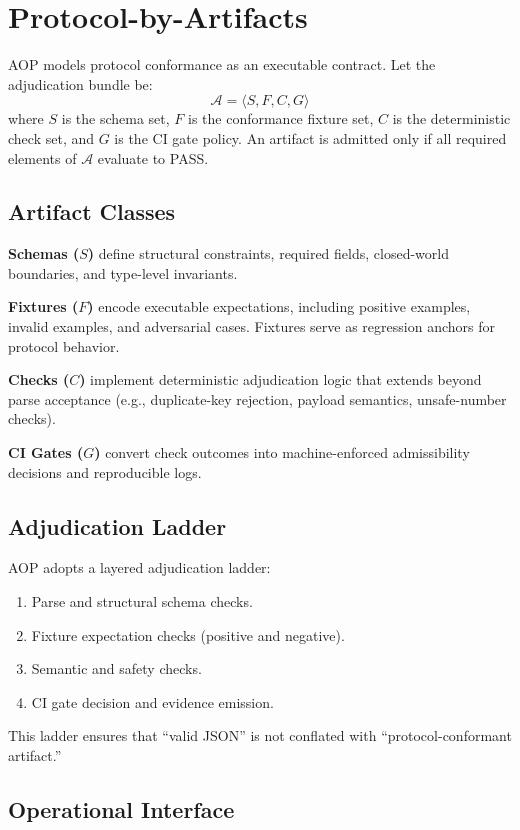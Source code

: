 \documentclass[10pt,conference]{IEEEtran}
\begin{document}
\section{Protocol-by-Artifacts}

AOP models protocol conformance as an executable contract. Let the adjudication
bundle be:
\[
\mathcal{A} = \langle S, F, C, G \rangle
\]
where $S$ is the schema set, $F$ is the conformance fixture set,
$C$ is the deterministic check set, and $G$ is the CI gate policy.
An artifact is admitted only if all required elements of
$\mathcal{A}$ evaluate to PASS.

\subsection{Artifact Classes}

\textbf{Schemas ($S$)} define structural constraints, required fields,
closed-world boundaries, and type-level invariants.

\textbf{Fixtures ($F$)} encode executable expectations, including positive
examples, invalid examples, and adversarial cases. Fixtures serve as regression
anchors for protocol behavior.

\textbf{Checks ($C$)} implement deterministic adjudication logic that extends
beyond parse acceptance (e.g., duplicate-key rejection, payload semantics,
unsafe-number checks).

\textbf{CI Gates ($G$)} convert check outcomes into machine-enforced
admissibility decisions and reproducible logs.

\subsection{Adjudication Ladder}

AOP adopts a layered adjudication ladder:
\begin{enumerate}
\item Parse and structural schema checks.
\item Fixture expectation checks (positive and negative).
\item Semantic and safety checks.
\item CI gate decision and evidence emission.
\end{enumerate}

This ladder ensures that ``valid JSON'' is not conflated with
``protocol-conformant artifact.''

\subsection{Operational Interface}
\end{document}
